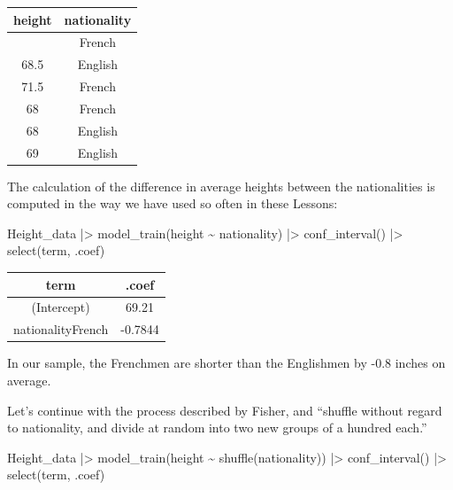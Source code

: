 \documentclass[
  letterpaper,
  DIV=11,
  numbers=noendperiod,
  oneside]{scrartcl}
\newenvironment{Shaded}{\begin{snugshade}}{\end{snugshade}}
\newcommand{\FunctionTok}[1]{\textcolor[rgb]{0.28,0.35,0.67}{#1}}
\newcommand{\NormalTok}[1]{\textcolor[rgb]{0.00,0.23,0.31}{#1}}
\newcommand{\SpecialCharTok}[1]{\textcolor[rgb]{0.37,0.37,0.37}{#1}}
\newcommand*\circled[1]{\tikz[baseline=(char.base)]{
          \node[shape=circle,draw,inner sep=1pt] (char) {{\scriptsize#1}};}}
\begin{document}
\begin{longtable}[]{@{}cc@{}}
\toprule\noalign{}
height & nationality \\
\midrule\noalign{}
\endhead
\bottomrule\noalign{}
\endlastfoot
68 & French \\
68.5 & English \\
71.5 & French \\
68 & French \\
68 & English \\
69 & English \\
\end{longtable}

The calculation of the difference in average heights between the
nationalities is computed in the way we have used so often in these
Lessons:

\begin{Shaded}
\begin{Highlighting}[]
\NormalTok{Height\_data }\SpecialCharTok{|\textgreater{}} 
  \FunctionTok{model\_train}\NormalTok{(height }\SpecialCharTok{\textasciitilde{}}\NormalTok{ nationality) }\SpecialCharTok{|\textgreater{}}
  \FunctionTok{conf\_interval}\NormalTok{() }\SpecialCharTok{|\textgreater{}}
  \FunctionTok{select}\NormalTok{(term, .coef)}
\end{Highlighting}
\end{Shaded}

\begin{longtable}[]{@{}cc@{}}
\toprule\noalign{}
term & .coef \\
\midrule\noalign{}
\endhead
\bottomrule\noalign{}
\endlastfoot
(Intercept) & 69.21 \\
nationalityFrench & -0.7844 \\
\end{longtable}

In our sample, the Frenchmen are shorter than the Englishmen by -0.8
inches on average.

Let's continue with the process described by Fisher, and ``shuffle
without regard to nationality, and divide at random into two new groups
of a hundred each.''

\label{annotated-cell-138}%
\begin{Shaded}
\begin{Highlighting}[]
\NormalTok{Height\_data }\SpecialCharTok{|\textgreater{}} 
  \FunctionTok{model\_train}\NormalTok{(height }\SpecialCharTok{\textasciitilde{}} \FunctionTok{shuffle}\NormalTok{(nationality)) }\SpecialCharTok{|\textgreater{}} \hspace*{\fill}\NormalTok{\circled{1}}
  \FunctionTok{conf\_interval}\NormalTok{() }\SpecialCharTok{|\textgreater{}} \hspace*{\fill}\NormalTok{\circled{2}}
  \FunctionTok{select}\NormalTok{(term, .coef)}
\end{Highlighting}
\end{Shaded}
\end{document}
